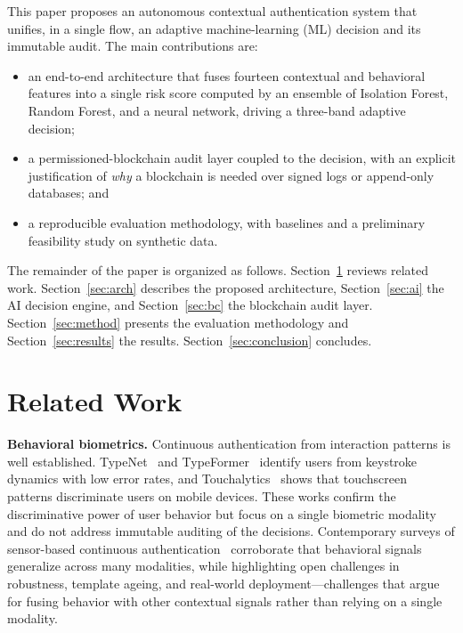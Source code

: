 \documentclass[conference]{IEEEtran}
\begin{document}
This paper proposes an autonomous contextual authentication system
that unifies, in a single flow, an adaptive machine-learning (ML)
decision and its immutable audit. The main contributions are:
\begin{itemize}
  \item an end-to-end architecture that fuses fourteen contextual and
        behavioral features into a single risk score computed by an
        ensemble of Isolation Forest, Random Forest, and a neural
        network, driving a three-band adaptive decision;
  \item a permissioned-blockchain audit layer coupled to the decision,
        with an explicit justification of \emph{why} a blockchain is
        needed over signed logs or append-only databases; and
  \item a reproducible evaluation methodology, with baselines and a
        preliminary feasibility study on synthetic data.
\end{itemize}

The remainder of the paper is organized as follows. Section~\ref{sec:related}
reviews related work. Section~\ref{sec:arch} describes the proposed
architecture, Section~\ref{sec:ai} the AI decision engine, and
Section~\ref{sec:bc} the blockchain audit layer.
Section~\ref{sec:method} presents the evaluation methodology and
Section~\ref{sec:results} the results. Section~\ref{sec:conclusion}
concludes.

\section{Related Work}
\label{sec:related}
\textbf{Behavioral biometrics.} Continuous authentication from
interaction patterns is well established. TypeNet~\cite{acien2022} and
TypeFormer~\cite{stragapede2024} identify users from keystroke dynamics
with low error rates, and Touchalytics~\cite{frank2013} shows that
touchscreen patterns discriminate users on mobile devices. These works
confirm the discriminative power of user behavior but focus on a
single biometric modality and do not address immutable auditing of the
decisions. Contemporary surveys of sensor-based continuous
authentication~\cite{abuhamad2021} corroborate that behavioral signals
generalize across many modalities, while highlighting open challenges in
robustness, template ageing, and real-world deployment---challenges that
argue for fusing behavior with other contextual signals rather than
relying on a single modality.
\end{document}
